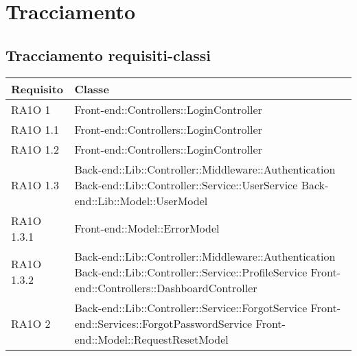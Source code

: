 \section{Tracciamento}
\subsection{Tracciamento requisiti-classi}

\begin{center}
      \bgroup
      \def\arraystretch{1.8}
      \begin{longtable}{ | p{3cm} | p{11cm} | }
    \hline
    
      \cellcolor[gray]{0.9} \textbf{Requisito} & \cellcolor[gray]{0.9} \textbf{Classe} \\ \hline
      
	RA1O 1 & Front-end::Controllers::LoginController \newline  \\ \hline 
	RA1O 1.1 & Front-end::Controllers::LoginController \newline  \\ \hline 
	RA1O 1.2 & Front-end::Controllers::LoginController \newline  \\ \hline      

	RA1O 1.3 & Back-end::Lib::Controller::Middleware::Authentication  \newline Back-end::Lib::Controller::Service::UserService \newline Back-end::Lib::Model::UserModel \\ \hline  
    
    RA1O 1.3.1 & Front-end::Model::ErrorModel \newline  \\ \hline 
           
    RA1O 1.3.2 & Back-end::Lib::Controller::Middleware::Authentication \newline
        			Back-end::Lib::Controller::Service::ProfileService \newline
        			Front-end::Controllers::DashboardController \newline  \\ \hline 
        				
        				     
    RA1O 2 & Back-end::Lib::Controller::Service::ForgotService \newline
    			Front-end::Services::ForgotPasswordService \newline
    			Front-end::Model::RequestResetModel  \newline  \\ \hline   
    			   

\end{longtable}
\end{center}
